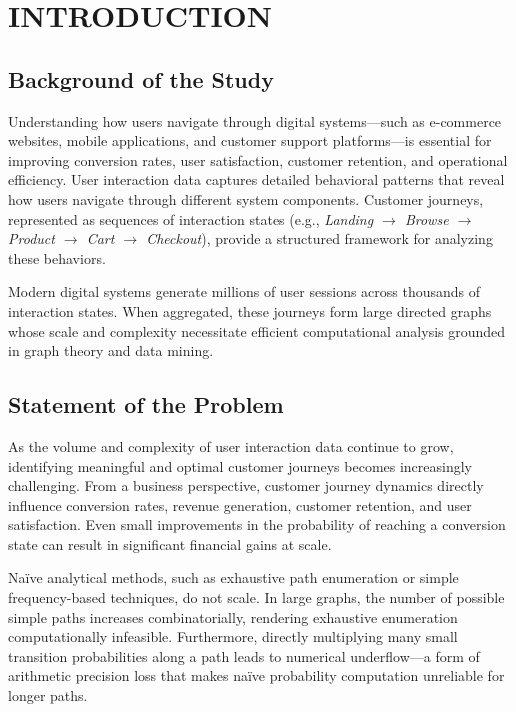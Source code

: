 \chapter{INTRODUCTION}

\section{Background of the Study}

Understanding how users navigate through digital systems---such as e-commerce websites, mobile applications, and customer support platforms---is essential for improving conversion rates, user satisfaction, customer retention, and operational efficiency. User interaction data captures detailed behavioral patterns that reveal how users navigate through different system components. Customer journeys, represented as sequences of interaction states (e.g., \emph{Landing $\rightarrow$ Browse $\rightarrow$ Product $\rightarrow$ Cart $\rightarrow$ Checkout}), provide a structured framework for analyzing these behaviors.

Modern digital systems generate millions of user sessions across thousands of interaction states. When aggregated, these journeys form large directed graphs whose scale and complexity necessitate efficient computational analysis grounded in graph theory and data mining.

\section{Statement of the Problem}

As the volume and complexity of user interaction data continue to grow, identifying meaningful and optimal customer journeys becomes increasingly challenging. From a business perspective, customer journey dynamics directly influence conversion rates, revenue generation, customer retention, and user satisfaction. Even small improvements in the probability of reaching a conversion state can result in significant financial gains at scale.

Na\"{i}ve analytical methods, such as exhaustive path enumeration or simple frequency-based techniques, do not scale. In large graphs, the number of possible simple paths increases combinatorially, rendering exhaustive enumeration computationally infeasible. Furthermore, directly multiplying many small transition probabilities along a path leads to numerical underflow---a form of arithmetic precision loss that makes na\"{i}ve probability computation unreliable for longer paths.

